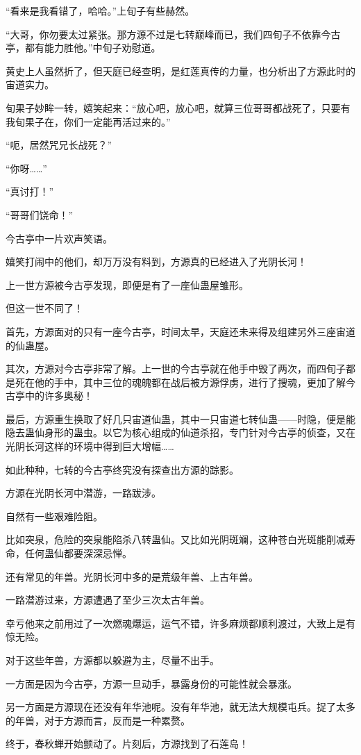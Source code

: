 \begin{this_body}
“看来是我看错了，哈哈。”上旬子有些赫然。

“大哥，你勿要太过紧张。那方源不过是七转巅峰而已，我们四旬子不依靠今古亭，都有能力胜他。”中旬子劝慰道。

黄史上人虽然折了，但天庭已经查明，是红莲真传的力量，也分析出了方源此时的宙道实力。

旬果子妙眸一转，嬉笑起来：“放心吧，放心吧，就算三位哥哥都战死了，只要有我旬果子在，你们一定能再活过来的。”

“呃，居然咒兄长战死？”

“你呀……”

“真讨打！”

“哥哥们饶命！”

今古亭中一片欢声笑语。

嬉笑打闹中的他们，却万万没有料到，方源真的已经进入了光阴长河！

上一世方源被今古亭发现，即便是有了一座仙蛊屋雏形。

但这一世不同了！

首先，方源面对的只有一座今古亭，时间太早，天庭还未来得及组建另外三座宙道的仙蛊屋。

其次，方源对今古亭非常了解。上一世的今古亭就在他手中毁了两次，而四旬子都是死在他的手中，其中三位的魂魄都在战后被方源俘虏，进行了搜魂，更加了解今古亭中的许多奥秘！

最后，方源重生换取了好几只宙道仙蛊，其中一只宙道七转仙蛊——时隐，便是能隐去蛊仙身形的蛊虫。以它为核心组成的仙道杀招，专门针对今古亭的侦查，又在光阴长河这样的环境中得到巨大增幅……

如此种种，七转的今古亭终究没有探查出方源的踪影。

方源在光阴长河中潜游，一路跋涉。

自然有一些艰难险阻。

比如突泉，危险的突泉能陷杀八转蛊仙。又比如光阴斑斓，这种苍白光斑能削减寿命，任何蛊仙都要深深忌惮。

还有常见的年兽。光阴长河中多的是荒级年兽、上古年兽。

一路潜游过来，方源遭遇了至少三次太古年兽。

幸亏他来之前用过了一次燃魂爆运，运气不错，许多麻烦都顺利渡过，大致上是有惊无险。

对于这些年兽，方源都以躲避为主，尽量不出手。

一方面是因为今古亭，方源一旦动手，暴露身份的可能性就会暴涨。

另一方面是方源现在还没有年华池呢。没有年华池，就无法大规模屯兵。捉了太多的年兽，对于方源而言，反而是一种累赘。

终于，春秋蝉开始颤动了。片刻后，方源找到了石莲岛！

\end{this_body}

